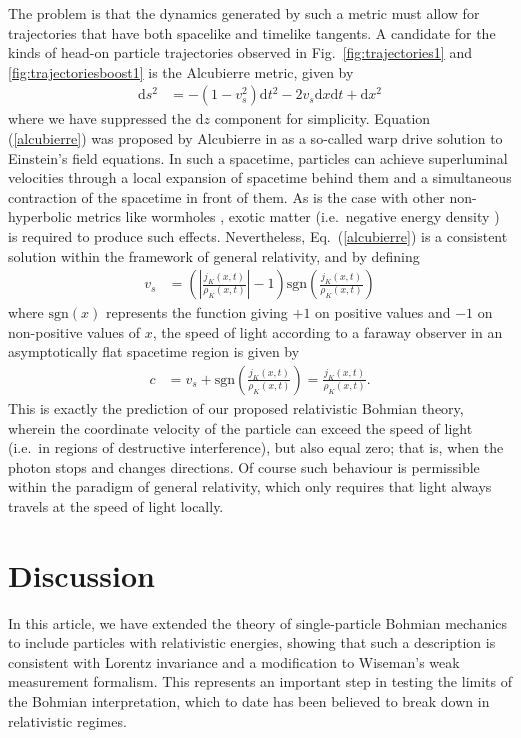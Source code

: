 \documentclass[12pt,prx,
,nofootinbib
,floatfix
,superscriptaddress
]{revtex4-2}
\newcommand{\D}{\mathrm{d}}
\begin{document}
The problem is that the dynamics generated by such a metric must allow for trajectories that have both spacelike and timelike tangents. A candidate for the kinds of head-on particle trajectories observed in Fig.\ \ref{fig:trajectories1} and \ref{fig:trajectoriesboost1} is the Alcubierre metric, given by 
\begin{align}\label{alcubierre}
    \D s^2 &= - (1 - v_s^2) \D t^2 - 2 v_s \D x \D t + \D x^2 
\end{align}
where we have suppressed the $\D z$ component for simplicity. Equation (\ref{alcubierre}) was proposed by Alcubierre in \cite{Alcubierre_1994} as a so-called warp drive solution to Einstein's field equations. In such a spacetime, particles can achieve superluminal velocities through a local expansion of spacetime behind them and a simultaneous contraction of the spacetime in front of them. As is the case with other non-hyperbolic metrics like wormholes
\cite{einsteinPhysRev.48.73,morrisdoi:10.1119/1.15620}, exotic matter (i.e.\ negative energy density \cite{fordPhysRevD.55.2082}) is required to produce such effects. Nevertheless, Eq.\ (\ref{alcubierre}) is a consistent solution within the framework of general relativity, and by defining
\begin{align}
    v_s &= \left( \left| \frac{j_{K}(x,t)}{\rho_{K}(x,t)} \right| - 1 \right) \text{sgn} \left( \frac{j_{K}(x,t)}{\rho_{K}(x,t)} \right) 
\end{align}
where $\text{sgn}(x)$ represents the function giving $+1$ on positive values and $-1$ on non-positive values of $x$, the speed of light according to a faraway observer in an asymptotically flat spacetime region is given by
\begin{align}
    c &= v_s + \text{sgn}\left(\frac{j_K(x,t)}{\rho_K(x,t)} \right) = \frac{j_K(x,t)}{\rho_K(x,t)} .
\end{align}
This is exactly the prediction of our proposed relativistic Bohmian theory, wherein the coordinate velocity of the particle can exceed the speed of light (i.e.\ in regions of destructive interference), but also equal zero; that is, when the photon stops and changes directions. Of course such behaviour is permissible within the paradigm of general relativity, which only requires that light always travels at the speed of light locally.

\section{Discussion}
In this article, we have extended the theory of single-particle Bohmian mechanics to include particles with relativistic energies, showing that such a description is consistent with Lorentz invariance and a modification to Wiseman's weak measurement formalism. This represents an important step in testing the limits of the Bohmian interpretation, which to date has been believed to break down in relativistic regimes.
\end{document}
